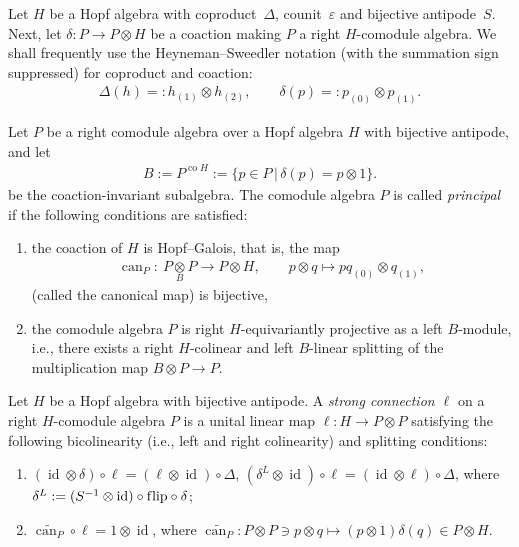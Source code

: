 \documentclass[pdftex]{sigma}
\numberwithin{equation}{section}
\begin{document}
Let $H$ be a Hopf algebra with coproduct~$\Delta$, counit~$\varepsilon$ and bijective
antipode~$S$. Next, let \mbox{$\delta\colon P\to P\otimes H$} be a coaction making $P$ a right
\mbox{$H$-comodule} algebra.
We shall frequently use
the Heyneman--Sweedler notation (with the summation sign suppressed) for coproduct and coaction:
\begin{gather*}
\Delta (h)=:h_{(1)}\otimes h_{(2)} ,\qquad
\delta(p)=:p_{(0)}\otimes p_{(1)} .
\end{gather*}
\begin{Definition}
Let $P$ be a right comodule algebra over a Hopf algebra
$H$ with bijective antipode, and let
\begin{gather*}
B:=P^{\operatorname{co}H} := \{ p \in P \, | \, \delta (p) = p \otimes 1 \}.
\end{gather*}
be the coaction-invariant
subalgebra. The comodule algebra $P$
is called {\em principal} if the following conditions are satisf\/ied:
\begin{enumerate}\itemsep=0pt
\item[1)]
the coaction of $H$ is Hopf--Galois, that is, the map
\begin{gather*}
\operatorname{can}_P \colon \  P \underset{B}{\otimes} P \longrightarrow P \otimes H,\qquad
	p \otimes q \longmapsto pq_{(0)} \otimes q_{(1)} ,
\end{gather*}
(called the canonical map) is bijective,
\item[2)]
the comodule algebra $P$ is right
$H$-equivariantly projective as a left  $B$-module, i.e.,
 there exists
 a right $H$-colinear and left $B$-linear
splitting of the multiplication map
$B \otimes P \rightarrow P$.
\end{enumerate}
\end{Definition}

\begin{Definition}[\cite{bh04}]\label{strong}
Let $ H$ be a Hopf algebra with  bijective antipode.
A \emph{strong connection $\ell$} on a right $H$-comodule algebra $P$ is a unital linear map $\ell\colon  H
\rightarrow  P \otimes  P$ satisfying
the following bicolinearity (i.e., left and right colinearity) and splitting conditions:
\begin{enumerate}\itemsep=0pt
\item[1)]
$(\operatorname{id}\otimes \delta) \circ
\ell = (\ell \otimes \operatorname{id}) \circ \Delta$,
$(\delta^L \otimes \operatorname{id}) \circ
\ell = (\operatorname{id} \otimes \ell) \circ
\Delta$, where
$\delta^L :=(S^{-1}\otimes\operatorname{id})\circ\mathrm{f\/lip}\circ\delta$;
\item[2)]
$\widetilde{\operatorname{can}_P} \circ \ell=1 \otimes \operatorname{id}$, where
$\widetilde{\operatorname{can}_P}\colon  P\otimes  P\ni p\otimes q\mapsto (p\otimes 1)\delta(q)\in  P\otimes H$.
\end{enumerate}
\end{Definition}
\end{document}
